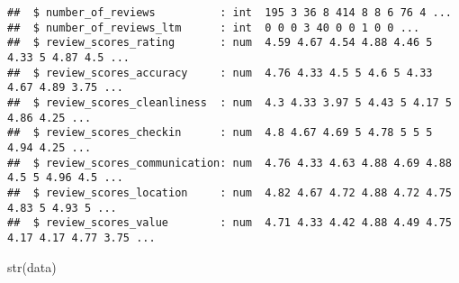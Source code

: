 \documentclass[
]{article}
\newenvironment{Shaded}{\begin{snugshade}}{\end{snugshade}}
\newcommand{\FunctionTok}[1]{\textcolor[rgb]{0.00,0.00,0.00}{#1}}
\newcommand{\NormalTok}[1]{#1}
\begin{document}
\begin{verbatim}
##  $ number_of_reviews          : int  195 3 36 8 414 8 8 6 76 4 ...
##  $ number_of_reviews_ltm      : int  0 0 0 3 40 0 0 1 0 0 ...
##  $ review_scores_rating       : num  4.59 4.67 4.54 4.88 4.46 5 4.33 5 4.87 4.5 ...
##  $ review_scores_accuracy     : num  4.76 4.33 4.5 5 4.6 5 4.33 4.67 4.89 3.75 ...
##  $ review_scores_cleanliness  : num  4.3 4.33 3.97 5 4.43 5 4.17 5 4.86 4.25 ...
##  $ review_scores_checkin      : num  4.8 4.67 4.69 5 4.78 5 5 5 4.94 4.25 ...
##  $ review_scores_communication: num  4.76 4.33 4.63 4.88 4.69 4.88 4.5 5 4.96 4.5 ...
##  $ review_scores_location     : num  4.82 4.67 4.72 4.88 4.72 4.75 4.83 5 4.93 5 ...
##  $ review_scores_value        : num  4.71 4.33 4.42 4.88 4.49 4.75 4.17 4.17 4.77 3.75 ...
\end{verbatim}

\begin{Shaded}
\begin{Highlighting}[]
\FunctionTok{str}\NormalTok{(data)}
\end{Highlighting}
\end{Shaded}
\end{document}
